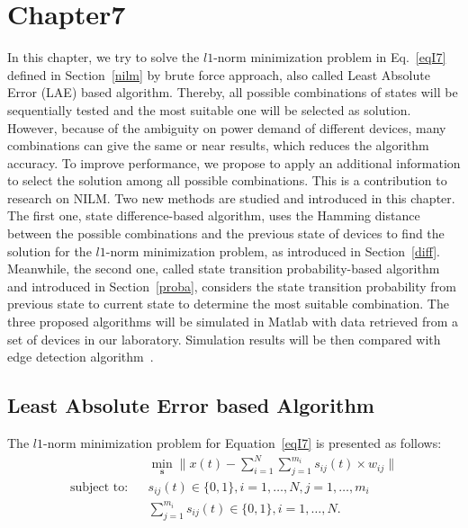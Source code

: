 \chapter{Chapter7} %
\label{l7norm}

In this chapter, we try to solve the $l1$-norm minimization problem in Eq.~\eqref{eqI7} defined in Section~\ref{nilm} by brute force approach, also called Least Absolute Error (LAE) based algorithm. Thereby, all possible combinations of states will be sequentially tested and the most suitable one will be selected as solution. However, because of the ambiguity on power demand of different devices, many combinations can give the same or near results, which reduces the algorithm accuracy. To improve performance, we propose to apply an additional information to select the solution among all possible combinations. This is a contribution to research on NILM. Two new methods are studied and introduced in this chapter. The first one, state difference-based algorithm, uses the Hamming distance between the possible combinations and the previous state of devices to find the solution for the $l1$-norm minimization problem, as introduced in Section~\ref{diff}. Meanwhile, the second one, called state transition probability-based algorithm and introduced in Section~\ref{proba}, considers the state transition probability from previous state to current state to determine the most suitable combination. The three proposed algorithms will be simulated in Matlab with data retrieved from a set of devices in our laboratory. Simulation results will be then compared with edge detection algorithm~\cite{Hart92}.

\section{Least Absolute Error based Algorithm}\label{LAE}
The $l1$-norm minimization problem for Equation~\eqref{eqI7} is presented as follows:
\begin{eqnarray}\label{eqL1}
 &&\min_{\mathbf{s}}\parallel x(t)-\sum_{i=1}^{N}{\sum_{j=1}^{m_i}{s_{ij}(t)\times w_{ij}}}\parallel\\
\mbox{subject to:}&& s_{ij}(t)\in \{0,1\}, i=1,\ldots,N,j=1,\ldots,m_i\nonumber\\
&&\sum_{j=1}^{m_i}{s_{ij}(t)}\in \{0,1\}, i=1,\ldots,N. \nonumber
\end{eqnarray} 

